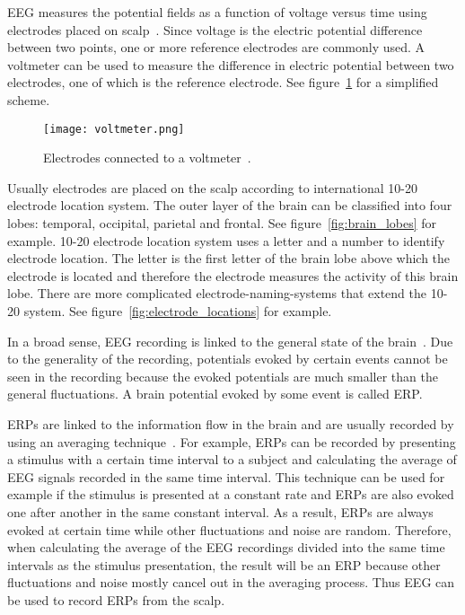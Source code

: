 \gls{EEG} measures the potential fields as a function of voltage versus time using electrodes placed on scalp~\cite{field_count}. Since voltage is the electric potential difference between two points, one or more reference electrodes are commonly used. A voltmeter can be used to measure the difference in electric potential between two electrodes, one of which is the reference electrode. See figure~\ref{fig:voltmeter} for a simplified scheme.

\begin{figure}[h!]
	\centering
	\texttt{[image: voltmeter.png]}
	\caption{Electrodes connected to a voltmeter~\cite[p.~120]{ERP}.}
	\label{fig:voltmeter}
\end{figure}

Usually electrodes are placed on the scalp according to international 10-20 electrode location system. The outer layer of the brain can be classified into four lobes: temporal, occipital, parietal and frontal. See figure~\ref{fig:brain_lobes} for example. 10-20 electrode location system uses a letter and a number to identify electrode location. The letter is the first letter of the brain lobe above which the electrode is located and therefore the electrode measures the activity of this brain lobe. There are more complicated electrode-naming-systems that extend the 10-20 system. See figure~\ref{fig:electrode_locations} for example.

In a broad sense, \gls{EEG} recording is linked to the general state of the brain~\cite{VEP}. Due to the generality of the recording, potentials evoked by certain events cannot be seen in the recording because the evoked potentials are much smaller than the general fluctuations. A brain potential evoked by some event is called \gls{ERP}. 

\glspl{ERP} are linked to the information flow in the brain and are usually recorded by using an averaging technique~\cite{ERP}. For example, \glspl{ERP} can be recorded by presenting a stimulus with a certain time interval to a subject and calculating the average of \gls{EEG} signals recorded in the same time interval. This technique can be used for example if the stimulus is presented at a constant rate and \glspl{ERP} are also evoked one after another in the same constant interval. As a result, \glspl{ERP} are always evoked at certain time while other fluctuations and noise are random. Therefore, when calculating the average of the \gls{EEG} recordings divided into the same time intervals as the stimulus presentation, the result will be an \gls{ERP} because other fluctuations and noise mostly cancel out in the averaging process. Thus \gls{EEG} can be used to record \glspl{ERP} from the scalp. 

